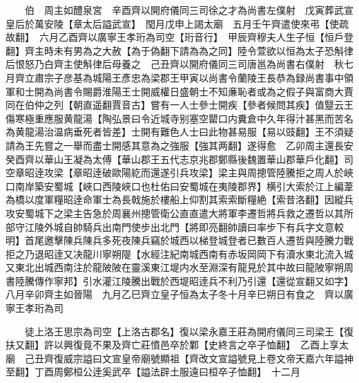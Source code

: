 　　伯　周主如醴泉宮　辛酉齊以開府儀同三司徐之才為尚書左僕射　戊寅葬武宣皇后於萬安陵【章太后謚武宣】　閠月戊申上謁太廟　五月壬午齊遣使來弔【使疏故翻】　六月乙酉齊以廣寧王孝珩為司空【珩音行】　甲辰齊穆夫人生子恒【恒戶登翻】齊主時未有男為之大赦【為于偽翻下請為為之同】陸令萱欲以恒為太子恐斛律后恨怒乃白齊主使斛律后母養之　己丑齊以開府儀同三司唐邕為尚書右僕射　秋七月齊立肅宗子彦基為城陽王彥忠為梁郡王甲寅以尚書令蘭陵王長恭為録尚書事中領軍和士開為尚書令賜爵淮陽王士開威權日盛朝士不知亷恥者或為之假子與富商大賈同在伯仲之列【朝直遥翻賈音古】嘗有一人士參士開疾【參者候問其疾】值毉云王傷寒極重應服黄龍湯【陶弘景曰令近城寺别塞空罌口内糞倉中久年得汁甚黑而苦名為黄龍湯治温病垂死者皆差】士開有難色人士曰此物甚易服【易以豉翻】王不須疑請為王先嘗之一舉而盡士開感其意為之強服【強其两翻】遂得愈　乙卯周主還長安　癸酉齊以華山王凝為太傅【華山郡王五代志京兆郡鄭縣後魏置華山郡華戶化翻】司空章昭逹攻梁【章昭逹破歐陽紇而還遂引兵攻梁】梁主與周摠管陸騰拒之周人於峽口南岸築安蜀城【峽口西陵峽口也杜佑曰安蜀城在夷陵郡界】横引大索於江上編葦為橋以度軍糧昭逹命軍士為長戟施於樓船上仰割其索索斷糧絶【索昔洛翻】因縱兵攻安蜀城下之梁主告急於周襄州摠管衛公直直遣大將軍李遷哲將兵救之遷哲以其所部守江陵外城自帥騎兵出南門使步出北門【將即亮翻帥讀曰率步下有兵字文意較明】首尾邀擊陳兵陳兵多死夜陳兵竊於城西以梯登城登者已數百人遷哲與陸騰力戰拒之乃退昭逹又决龍川寧朔隄【水經注紀南城西南有赤坂岡岡下有瀆水東北流入城又東北出城西南注於龍陂陂在靈溪東江堤内水至淵深有龍見於其中故曰龍陂寧朔周書陸騰傳作寧邦】引水灌江陵騰出戰於西堤昭逹兵不利乃引還【還從宣翻又如字】　八月辛卯齊主如晉陽　九月乙巳齊立皇子恒為太子冬十月辛巳朔日有食之　齊以廣寧王孝珩為司

　　徒上洛王思宗為司空【上洛古郡名】復以梁永嘉王莊為開府儀同三司梁王【復扶又翻】許以興復竟不果及齊亡莊憤邑卒於鄴【史終言之卒子恤翻】　乙酉上享太廟　己丑齊復威宗謚曰文宣皇帝廟號顯祖【齊改文宣謚號見上卷文帝天嘉六年謚神至翻】丁酉周鄭桓公逹奚武卒【謚法辟土服遠曰桓卒子恤翻】　十二月

